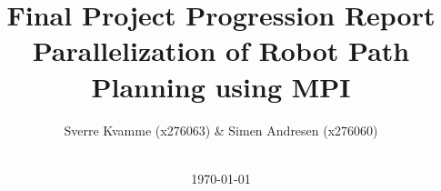 



\title{Final Project Progression Report \\ Parallelization of Robot Path Planning using MPI}
\author{Sverre Kvamme (x276063) \& Simen Andresen (x276060)}
\date{\ \\  \today}




\maketitle


\pagestyle{fancy}
\lhead{}
\setcounter{page}{1}

\cfoot{\thepage}



%



